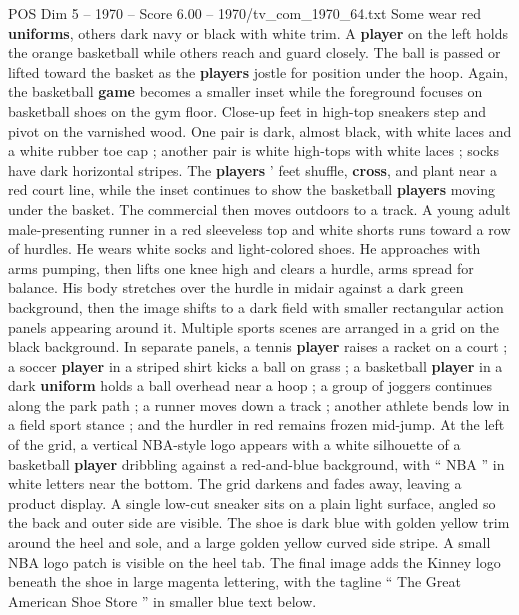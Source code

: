 \begin{textsample}{POS Dim 5 – 1970 – Score 6.00 – 1970/tv\_com\_1970\_64.txt}
Some wear red \textbf{uniforms}, others dark navy or black with white trim.
A \textbf{player} on the left holds the orange basketball while others reach and guard closely.
The ball is passed or lifted toward the basket as the \textbf{players} jostle for position under the hoop.
Again, the basketball \textbf{game} becomes a smaller inset while the foreground focuses on basketball shoes on the gym floor.
Close-up feet in high-top sneakers step and pivot on the varnished wood.
One pair is dark, almost black, with white laces and a white rubber toe cap ; another pair is white high-tops with white laces ; socks have dark horizontal stripes.
The \textbf{players} ’ feet shuffle, \textbf{cross}, and plant near a red court line, while the inset continues to show the basketball \textbf{players} moving under the basket.
The commercial then moves outdoors to a track.
A young adult male-presenting runner in a red sleeveless top and white shorts runs toward a row of hurdles.
He wears white socks and light-colored shoes.
He approaches with arms pumping, then lifts one knee high and clears a hurdle, arms spread for balance.
His body stretches over the hurdle in midair against a dark green background, then the image shifts to a dark field with smaller rectangular action panels appearing around it.
Multiple sports scenes are arranged in a grid on the black background.
In separate panels, a tennis \textbf{player} raises a racket on a court ; a soccer \textbf{player} in a striped shirt kicks a ball on grass ; a basketball \textbf{player} in a dark \textbf{uniform} holds a ball overhead near a hoop ; a group of joggers continues along the park path ; a runner moves down a track ; another athlete bends low in a field sport stance ; and the hurdler in red remains frozen mid-jump.
At the left of the grid, a vertical NBA-style logo appears with a white silhouette of a basketball \textbf{player} dribbling against a red-and-blue background, with “ NBA ” in white letters near the bottom.
The grid darkens and fades away, leaving a product display.
A single low-cut sneaker sits on a plain light surface, angled so the back and outer side are visible.
The shoe is dark blue with golden yellow trim around the heel and sole, and a large golden yellow curved side stripe.
A small NBA logo patch is visible on the heel tab.
The final image adds the Kinney logo beneath the shoe in large magenta lettering, with the tagline “ The Great American Shoe Store ” in smaller blue text below.

\end{textsample}
